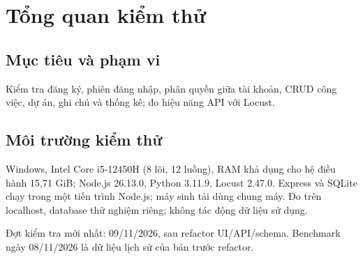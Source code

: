 \section{Tổng quan kiểm thử}

\subsection{Mục tiêu và phạm vi}
Kiểm tra đăng ký, phiên đăng nhập, phân quyền giữa tài khoản, CRUD công việc,
dự án, ghi chú và thống kê; đo hiệu năng API với Locust.

\subsection{Môi trường kiểm thử}
Windows, Intel Core i5-12450H (8 lõi, 12 luồng), RAM khả dụng cho hệ điều hành
15,71 GiB; Node.js 26.13.0, Python 3.11.9, Locust 2.47.0.
Express và SQLite chạy trong một tiến trình Node.js; máy sinh tải dùng chung máy.
Đo trên localhost, database thử nghiệm riêng; không tác động dữ liệu sử dụng.

Đợt kiểm tra mới nhất: 09/11/2026, sau refactor UI/API/schema.
Benchmark ngày 08/11/2026 là dữ liệu lịch sử của bản trước refactor.

